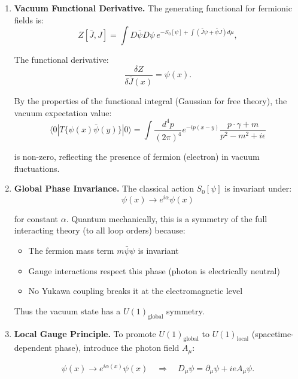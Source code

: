 \begin{enumerate}
\item \textbf{Vacuum Functional Derivative.} The generating functional for fermionic fields is:
\begin{equation}
Z[\bar{J}, J] = \int D\bar{\psi} D\psi \, e^{-S_0[\psi] + \int (\bar{J}\psi + \bar{\psi}J) d\mu},
\end{equation}

The functional derivative:
\begin{equation}
\frac{\delta Z}{\delta \bar{J}(x)} = \psi(x).
\end{equation}

By the properties of the functional integral (Gaussian for free theory), the vacuum expectation value:
\begin{equation}
\langle 0|T\{\psi(x)\bar{\psi}(y)\}|0\rangle = \int \frac{d^4p}{(2\pi)^4} e^{-ip(x-y)} \frac{p\cdot\gamma + m}{p^2 - m^2 + i\epsilon}
\end{equation}

is non-zero, reflecting the presence of fermion (electron) in vacuum fluctuations.

\item \textbf{Global Phase Invariance.} The classical action $S_0[\psi]$ is invariant under:
\begin{equation}
\psi(x) \to e^{i\alpha} \psi(x)
\end{equation}

for constant $\alpha$. Quantum mechanically, this is a symmetry of the full interacting theory (to all loop orders) because:
\begin{itemize}
\item The fermion mass term $m\bar{\psi}\psi$ is invariant
\item Gauge interactions respect this phase (photon is electrically neutral)
\item No Yukawa coupling breaks it at the electromagnetic level
\end{itemize}

Thus the vacuum state has a $U(1)_{\text{global}}$ symmetry.

\item \textbf{Local Gauge Principle.} To promote $U(1)_{\text{global}}$ to $U(1)_{\text{local}}$ (spacetime-dependent phase), introduce the photon field $A_\mu$:

\begin{equation}
\psi(x) \to e^{i\alpha(x)} \psi(x) \quad \Rightarrow \quad D_\mu \psi = \partial_\mu \psi + i e A_\mu \psi.
\end{equation}


\end{enumerate}
